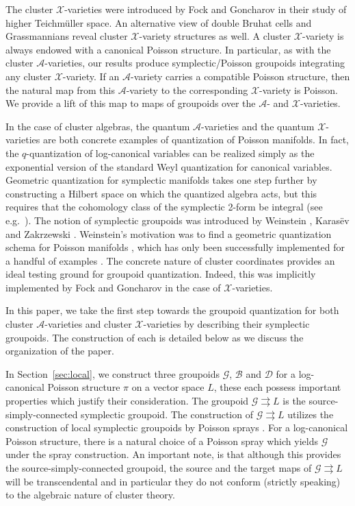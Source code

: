 \documentclass{amsart}
\numberwithin{equation}{section}
\newcommand{\cA}{\mathcal{A}}
\newcommand{\cB}{\mathcal{B}}
\newcommand{\cD}{\mathcal{D}}
\newcommand{\cG}{\mathcal{G}}
\newcommand{\cX}{\mathcal{X}}
\newcommand{\rra}{\rightrightarrows}
\begin{document}
The cluster $\cX$-varieties were introduced by Fock and Goncharov \cite{FG09a} in their study of higher Teichm\"uller space.
An alternative view of double Bruhat cells and Grassmannians reveal cluster $\cX$-variety structures as well.
A cluster $\cX$-variety is always endowed with a canonical Poisson structure.
In particular, as with the cluster $\cA$-varieties, our results produce symplectic/Poisson groupoids integrating any cluster $\cX$-variety.
If an $\cA$-variety carries a compatible Poisson structure, then the natural map from this $\cA$-variety to the corresponding $\cX$-variety is Poisson.
We provide a lift of this map to maps of groupoids over the $\cA$- and $\cX$-varieties.

In the case of cluster algebras, the quantum $\cA$-varieties \cite{berenstein-zelevinsky} and the quantum $\cX$-varieties \cite{FG09c} are both concrete examples of quantization of Poisson manifolds.
In fact, the $q$-quantization of log-canonical variables can be realized simply as the exponential version of the standard Weyl quantization for canonical variables.
Geometric quantization for symplectic manifolds takes one step further by constructing a Hilbert space on which the quantized algebra acts, but this requires that the cohomology class of the symplectic 2-form be integral (see e.g.\ \cite{MR1806388}).
The notion of symplectic groupoids was introduced by Weinstein \cite{MR866024}, Karas\"{e}v \cite{MR1008479} and Zakrzewski \cite{MR1081010, MR1081011}.
Weinstein's motivation was to find a geometric quantization schema for Poisson manifolds \cite{MR1104934}, which has only been successfully implemented for a handful of examples \cite{MR2238946, MR2417440, MR2925830}.
The concrete nature of cluster coordinates provides an ideal testing ground for groupoid quantization.
Indeed, this was implicitly implemented by Fock and Goncharov \cite{FG09c} in the case of $\cX$-varieties.

In this paper, we take the first step towards the groupoid quantization for both cluster $\cA$-varieties and cluster $\cX$-varieties by describing their symplectic groupoids.
The construction of each is detailed below as we discuss the organization of the paper.

In Section~\ref{sec:local}, we construct three groupoids $\cG$, $\cB$ and $\cD$ for a log-canonical Poisson structure $\pi$ on a vector space $L$, these each possess important properties which justify their consideration.
The groupoid $\cG \rra L$ is the source-simply-connected symplectic groupoid.
The construction of $\cG \rra L$ utilizes the construction of local symplectic groupoids by Poisson sprays \cite{MR2900786, CMS17}.
For a log-canonical Poisson structure, there is a natural choice of a Poisson spray which yields $\cG$ under the spray construction.
An important note, is that although this provides the source-simply-connected groupoid, the source and the target maps of $\cG \rra L$ will be transcendental and in particular they do not conform (strictly speaking) to the algebraic nature of cluster theory.
\end{document}
